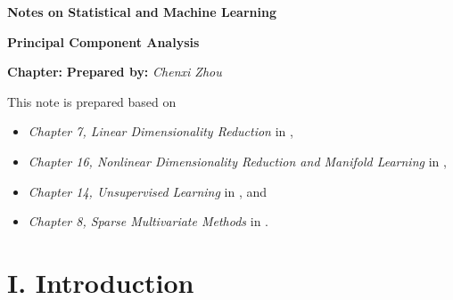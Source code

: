 \documentclass[12pt]{article}
\newcommand{\titlebox}[4]{
\begin{tcolorbox}[colback = blue!5!white!95, colframe = blue!70!black
]
  \noindent \textbf{ #1 } \hfill \textit{#2} 
  \begin{center}
  	 \LARGE{\textbf{#3}}
  \end{center}
\textbf{Chapter:} \textit{\text{#4}} \hfill \textbf{Prepared by:} \textit{Chenxi Zhou}
\end{tcolorbox}
}
\begin{document}
\thispagestyle{plain}
\titlebox{Notes on Statistical and Machine Learning}{}{Principal Component Analysis}{23}

\vspace{10pt} 

This note is prepared based on 
\begin{itemize}
	\item \textit{Chapter 7, Linear Dimensionality Reduction} in \textcite{Izenman2009-jk}, 
	\item \textit{Chapter 16, Nonlinear Dimensionality Reduction and Manifold Learning} in \textcite{Izenman2009-jk}, 
	\item \textit{Chapter 14, Unsupervised Learning} in \textcite{Friedman2001-np}, and 
	\item \textit{Chapter 8, Sparse Multivariate Methods} in \textcite{Hastie2015-rm}. 
\end{itemize}


\section*{I. Introduction}
\end{document}
